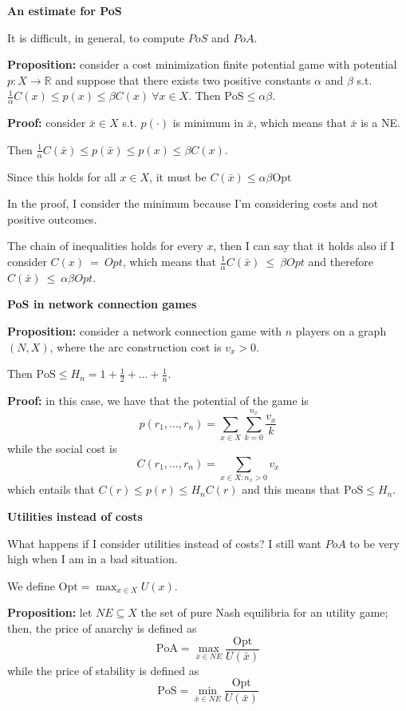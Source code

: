 \bigskip
\noindent \textbf{An estimate for PoS}

\noindent It is difficult, in general, to compute $PoS$ and $PoA$.

\bigskip
\noindent \textbf{Proposition:} consider a cost minimization finite potential game with potential $p: X \rightarrow \mathbb{R}$ and suppose that there exists two positive constants $\alpha$ and $\beta$ s.t. $\frac{1}{\alpha}C(x) \leq p(x) \leq \beta C(x) ~\forall x \in X$.
\noindent Then $\text{PoS} \leq \alpha \beta$.

\bigskip
\noindent \textbf{Proof:} consider $\bar{x} \in X$ s.t. $p(\cdot)$ is minimum in $\bar{x}$, which means that $\bar{x}$ is a NE.

\noindent Then $\frac{1}{\alpha}C(\bar{x}) \leq p(\bar{x}) \leq p(x) \leq \beta C(x)$.

\noindent Since this holds for all $x \in X$, it must be $C(\bar{x}) \leq \alpha \beta \text{Opt}$ 

\bigskip
\noindent In the proof, I consider the minimum because I'm considering 
costs and not positive outcomes.

\noindent The chain of inequalities holds for every $x$, then I can say 
that it holds also if I consider $C(x)~=~Opt$, which means that 
$\frac{1}{\alpha}C(\bar{x})~\leq~\beta Opt$ and therefore 
$C(\bar{x})~\leq~\alpha \beta Opt$.

\bigskip
\noindent \textbf{PoS in network connection games}

\bigskip
\noindent \textbf{Proposition:} consider a network connection game with $n$ players on a graph $(N,X)$, where the arc construction cost is $v_x > 0$.

\noindent Then $\text{PoS} \leq H_n = 1 + \frac{1}{2} + ... + \frac{1}{n}$.

\bigskip
\noindent \textbf{Proof:} in this case, we have that the potential of the game is
\[
	p(r_1,...,r_n) = \sum_{x \in X}{\sum_{k=0}^{n_x}{\frac{v_x}{k}}}
\]
while the social cost is
\[
	C(r_1,...,r_n) = \sum_{x \in X: n_x > 0}{v_x}
\]
which entails that $C(r) \leq p(r) \leq H_nC(r)$ and this means that 
$\text{PoS} \leq H_n$.

\bigskip
\noindent \textbf{Utilities instead of costs}

\noindent What happens if I consider utilities instead of costs? I still 
want $PoA$ to be very high when I am in a bad situation.

\noindent We define $\text{Opt} = \max_{x \in X}{U(x)}$.

\bigskip
\noindent \textbf{Proposition:} let $NE \subseteq X$ the set of pure Nash equilibria for an utility game; then, the price of anarchy is defined as
\[
	\text{PoA} = \max_{\bar{x} \in NE}{\frac{\text{Opt}}{U(\bar{x})}}
\]
while the price of stability is defined as
\[
\text{PoS} = \min_{\bar{x} \in NE}{\frac{\text{Opt}}{U(\bar{x})}}
\]

%
